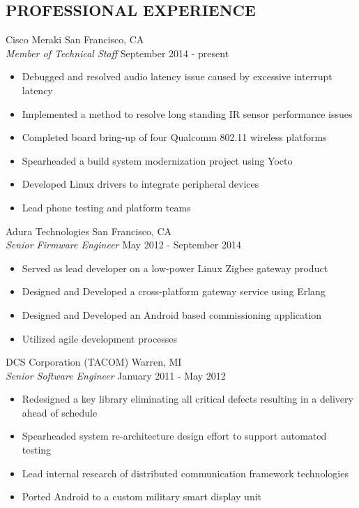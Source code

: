 \documentclass[line]{res}
\begin{document}
\begin{resume}
\section{PROFESSIONAL EXPERIENCE}
    \vspace{1mm}
    Cisco Meraki  \hfill San Francisco, CA\\
    {\sl Member of Technical Staff} \hfill September  2014 - present
    \vspace{1mm}
    \begin{itemize}
        \item Debugged and resolved audio latency issue caused by excessive interrupt latency
        \item Implemented a method to resolve long standing IR sensor performance issues     
        \item Completed board bring-up of four Qualcomm 802.11 wireless platforms
        \item Spearheaded a build system modernization project using Yocto
        \item Developed Linux drivers to integrate peripheral devices
	\item Lead phone testing and platform teams
    \end{itemize}
    \vspace{1mm}
    Adura Technologies  \hfill San Francisco, CA\\
    {\sl Senior Firmware Engineer} \hfill May  2012 - September 2014
    \vspace{1mm}
    \begin{itemize}
       \item Served as lead developer on a low-power Linux Zigbee gateway product
       \item Designed and Developed a cross-platform gateway service using Erlang
       \item Designed and Developed an Android based commissioning application
       \item Utilized agile development processes
    \end{itemize}
    \vspace{-1mm}
    DCS Corporation (TACOM)  \hfill Warren, MI\\
    {\sl Senior Software Engineer} \hfill January 2011 - May 2012
    \vspace{1mm}
    \begin{itemize}
       \item Redesigned a key library eliminating all critical defects resulting in a delivery ahead of schedule
       \item Spearheaded system re-architecture design effort to support automated testing
       \item Lead internal research of distributed communication framework technologies
       \item Ported Android to a custom military smart display unit
    \end{itemize}


\end{resume}
\end{document}
